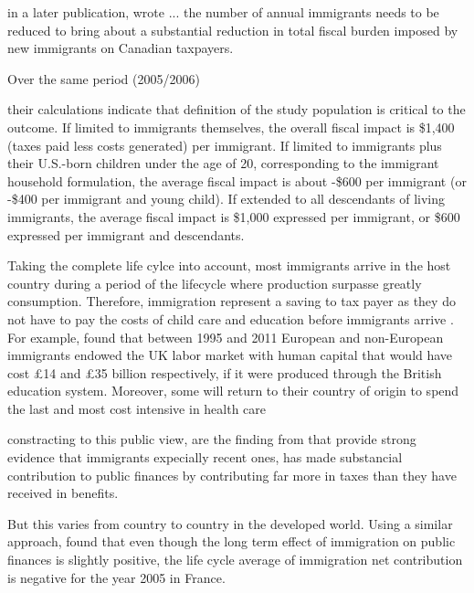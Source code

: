   in a later publication, \citep{grady2015immigration} wrote ... the number of annual immigrants needs to be reduced to bring about a substantial reduction in total fiscal burden imposed by new immigrants on Canadian taxpayers.

  Over the same period (2005/2006) \citep{Javdani:2013gu}




their calculations indicate that definition of the study population is critical to the outcome. If limited to immigrants themselves, the overall fiscal impact is \$1,400 (taxes paid less costs generated) per immigrant. If limited to immigrants plus their U.S.-born children under the age of 20, corresponding to the immigrant household formulation, the average fiscal impact is about -\$600 per immigrant (or -\$400 per immigrant and young child). If extended to all descendants of living immigrants, the average fiscal impact is \$1,000 expressed per immigrant, or \$600 expressed per immigrant and descendants.






  Taking the complete life cylce into account, most immigrants arrive in the host country during a period of the lifecycle where production surpasse greatly consumption. Therefore, immigration represent a saving to tax payer as they do not have to pay the costs of child care and education before immigrants arrive \citep{Bratsberg:2014cl}. For example, \citet{Dustmann:2014dr} found that  between 1995 and 2011 European and non-European immigrants endowed the UK labor  market with human capital that would have cost £14 and £35 billion respectively, if it were produced through the British education system. Moreover, some will return to their country of origin to spend the last and most cost intensive in health care \citep{Bratsberg:2014cl}


  constracting to this public view, are the finding from \citep{Dustmann:2014dr} that provide strong evidence that immigrants expecially recent ones, has made substancial contribution to public finances by contributing far more in taxes than they have received in benefits.

  But this varies from country to country in the developed world.
  Using a similar approach, \citep{Chojnicki:2011vu} found that even though the long term effect of immigration on public finances is slightly positive, the life cycle average of immigration net contribution is negative for the year 2005 in France.




